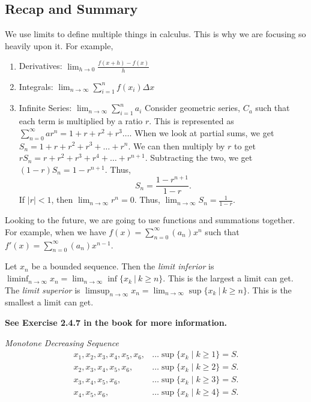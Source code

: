 \subsection{Recap and Summary}

We use limits to define multiple things in calculus. This is why we are focusing so heavily upon it. For example,

\begin{enumerate}
    \item Derivatives: \(\lim_{h \to 0} \frac{f(x + h) - f(x)}{h}\)
    \item Integrals: \(\lim_{n \to \infty} \sum_{i = 1}^{n} f(x_i) \Delta x\)
    \item Infinite Series: \(\lim_{n \to \infty} \sum_{i = 1}^{n} a_i\)
    Consider geometric series, \(C_a\) such that each term is multiplied by a ratio \(r\). This is represented as \(\sum_{n=0}^\infty ar^n = 1 + r + r^2 + r^3\dots\). When we look at partial sums, we get \(S_n = 1 + r + r^2 + r^3 + \dots + r^n\). We can then multiply by \(r\) to get \(rS_n = r + r^2 + r^3 + r^4 + \dots + r^{n+1}\). Subtracting the two, we get \((1 - r)S_n = 1 - r^{n+1}\). Thus, \[S_n = \frac{1 - r^{n+1}}{1 - r}.\] If \(|r| < 1\), then \(\lim_{n \to \infty} r^n = 0\). Thus, \(\lim_{n \to \infty} S_n = \frac{1}{1 - r}\).
\end{enumerate}

Looking to the future, we are going to use functions and summations together. For example, when we have \(f(x) = \sum_{n=0}^\infty (a_n)x^n\) such that \(f'(x) = \sum_{n=0}^\infty (a_n)x^{n-1}\).



\begin{definition}
    Let \(x_n\) be a bounded sequence. Then the \textit{limit inferior} is \(\liminf_{n \to \infty} x_n = \lim_{n \to \infty} \inf\{x_k \ | \ k \geq n\}\). This is the largest a limit can get. The \textit{limit superior} is \(\limsup_{n \to \infty} x_n = \lim_{n \to \infty} \sup\{x_k \ | \ k \geq n\}\). This is the smallest a limit can get.
\end{definition}

\textbf{See Exercise 2.4.7 in the book for more information.}

\begin{example}
    {\textit{Monotone Decreasing Sequence}} \begin{align*}
        x_1, x_2, x_3, x_4, x_5, x_6, &\dots \sup\{x_k \mid k \geq 1\} = S. \\
        x_2, x_3, x_4, x_5, x_6, &\dots \sup\{x_k \mid k \geq 2\} = S. \\
        x_3, x_4, x_5, x_6, &\dots \sup\{x_k \mid k \geq 3\} = S. \\
        x_4, x_5, x_6, &\dots \sup\{x_k \mid k \geq 4\} = S. 
    \end{align*}
\end{example}


